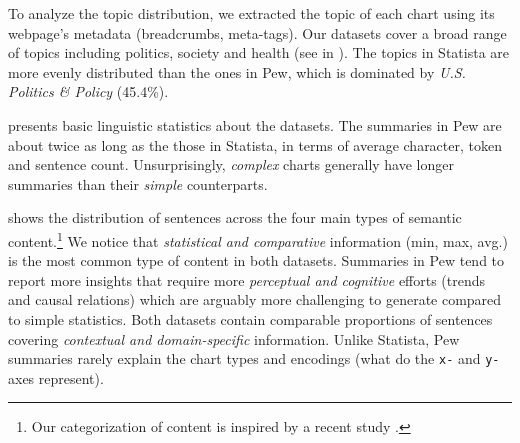 \begin{table}[t]
\centering
\small 
{}

\caption{Chart-to-text dataset statistics.
}
\label{dataset-statistics}
\end{table}



To analyze the topic distribution, we extracted the topic of each chart using its webpage's metadata
(\eg breadcrumbs, meta-tags).
Our datasets cover a broad range of topics including politics, society and health
(see  in ). The topics in Statista are more evenly distributed than the ones in Pew, which is dominated by \emph{U.S. Politics \& Policy} (45.4\%).





 presents basic linguistic statistics about the datasets. The summaries in Pew are about twice as long as the those in Statista, in terms of average character, token and sentence count. Unsurprisingly, \emph{complex} charts generally have longer summaries than their \emph{simple} counterparts.


 shows the distribution of sentences across the four  main types of semantic content.\footnote{Our categorization of content is inspired by a recent study \cite{accessibile-viz}.}
We notice that \emph{statistical and comparative} information (\eg min, max, avg.)
is the most common type of content in both datasets. Summaries in Pew tend to report more insights that require more \emph{perceptual and cognitive} efforts (\eg trends and causal relations) which are arguably more challenging to generate compared to simple statistics. Both datasets contain comparable proportions of sentences covering \emph{contextual and domain-specific} information. 
Unlike Statista, Pew summaries rarely explain the chart types and encodings (\eg what do the \texttt{x-} and \texttt{y-} axes represent).




